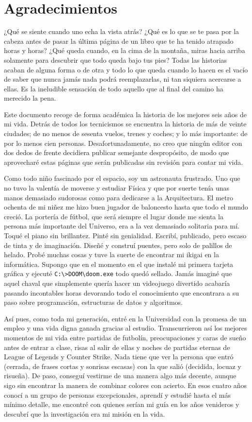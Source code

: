 \chapter{Agradecimientos}

¿Qué se siente cuando uno echa la vista atrás? ¿Qué es lo que se te pasa por la cabeza antes de pasar la última página de un libro que te ha tenido atrapado horas y horas? ¿Qué queda cuando, en la cima de la montaña, miras hacia arriba solamente para descubrir que todo queda bajo tus pies? Todas las historias acaban de alguna forma o de otra y todo lo que queda cuando lo hacen es el vacío de saber que nunca jamás nada podrá reemplazarlas, ni tan siquiera acercarse a ellas. Es la ineludible sensación de todo aquello que al final del camino ha merecido la pena.

Este documento recoge de forma académica la historia de los mejores seis años de mi vida. Detrás de todos los tecnicismos se encuentra la historia de más de veinte ciudades; de no menos de sesenta vuelos, trenes y coches; y lo más importante: de por lo menos cien personas. Desafortunadamente, no creo que ningún editor con dos dedos de frente decidiera publicar semejante despropósito, de modo que aprovecharé estas páginas que serán publicadas sin revisión para contar mi vida.

Como todo niño fascinado por el espacio, soy un astronauta frustrado. Uno que no tuvo la valentía de moverse y estudiar Física y que por suerte tenía unas manos demasiado sudorosas como para dedicarse a la Arquitectura. El metro ochenta de mi niñez me hizo buen jugador de baloncesto hasta que todo el mundo creció. La portería de fútbol, que será siempre el lugar donde me sienta la persona más importante del Universo, era a la vez demasiado solitaria para mí. Toqué el piano sin brillantez. Pinté sin genialidad. Escribí, publicado, pero escaso de tinta y de imaginación. Diseñé y construí puentes, pero solo de palillos de helado. Probé muchas cosas y tuve la suerte de encontrar mi ikigai en la informática. Supongo que en el momento en el que instalé mi primera tarjeta gráfica y ejecuté \verb|C:\>DOOM\doom.exe| todo quedó sellado. Jamás imaginé que aquel chaval que simplemente quería hacer un videojuego divertido acabaría pasando incontables horas devorando todo el conocimiento que encontrara a su paso sobre programación, estructuras de datos y algoritmos.

Así pues, como toda mi generación, entré en la Universidad con la promesa de un empleo y una vida digna ganada gracias al estudio. Transcurrieron así los mejores momentos de mi vida entre partidas de futbolín, preocupaciones y caras de sueño antes de entrar a clase, risas al salir de ellas y noches de partidas eternas de League of Legends y Counter Strike. Nada tiene que ver la persona que entró (cerrada, de frases cortas y sonrisas escasas) con la que salió (decidida, locuaz y risueña). De paso, conseguí vestirme de una manera algo más decente, aunque sigo sin encontrar la manera de combinar colores con acierto. En esos cuatro años conocí a un grupo de personas excepcionales, aprendí y estudié hasta el más mínimo detalle, me encontré con quienes serían mi guía en los años venideros y descubrí que la investigación era mi misión en la vida.

